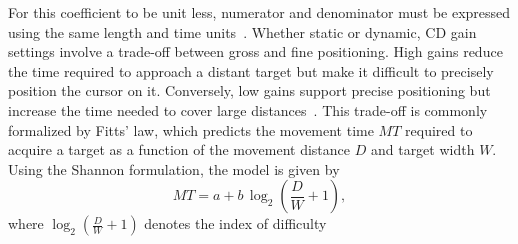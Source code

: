 \documentclass[12pt,a4paper]{report}
\begin{document}
        For this coefficient to be unit less, numerator and denominator must be expressed using the same length and time units~\cite{casiez2011no}. Whether static or dynamic, CD gain settings involve a trade-off between gross and fine positioning. High gains reduce the time required to approach a distant target but make it difficult to precisely position the cursor on it. Conversely, low gains support precise positioning but increase the time needed to cover large distances~\cite{mackenzie1995input}. This trade-off is commonly formalized by Fitts' law, which predicts the movement time $MT$ required to acquire a target as a function of the movement distance $D$ and target width $W$. Using the Shannon formulation, the model is given by
        \[
        MT = a + b\,\log_2\!\left(\frac{D}{W} + 1\right),
        \]
        where $\log_2\!\left(\frac{D}{W} + 1\right)$ denotes the index of difficulty
\end{document}
